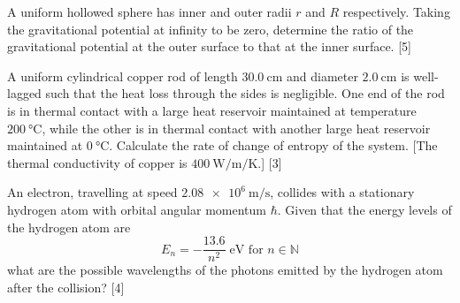 \begin{problem}
    \begin{subproblem}
        A uniform hollowed sphere has inner and outer radii $r$ and $R$ respectively. Taking the gravitational potential at infinity to be zero, determine the ratio of the gravitational potential at the outer surface to that at the inner surface.
    \hfill{[5]}\end{subproblem}
    \begin{subproblem}
        A uniform cylindrical copper rod of length $\qty{30.0}{\cm}$ and diameter $\qty{2.0}{\cm}$ is well-lagged such that the heat loss through the sides is negligible. One end of the rod is in thermal contact with a large heat reservoir maintained at temperature $\qty{200}{\degreeCelsius}$, while the other is in thermal contact with another large heat reservoir maintained at $\qty{0}{\degreeCelsius}$. Calculate the rate of change of entropy of the system. [The thermal conductivity of copper is $\qty{400}{\W\per\m\per\K}$.]
    \hfill{[3]}\end{subproblem}
    \begin{subproblem}
        An electron, travelling at speed $\qty{2.08e6}{\m\per\s}$, collides with a stationary hydrogen atom with orbital angular momentum $\hbar$. Given that the energy levels of the hydrogen atom are
        \[E_{n}=-\frac{13.6}{n^{2}}\;\mathrm{eV} \text { for } n \in \mathbb{N}\]
        what are the possible wavelengths of the photons emitted by the hydrogen atom after the collision?
    \hfill{[4]}\end{subproblem}
\end{problem}

